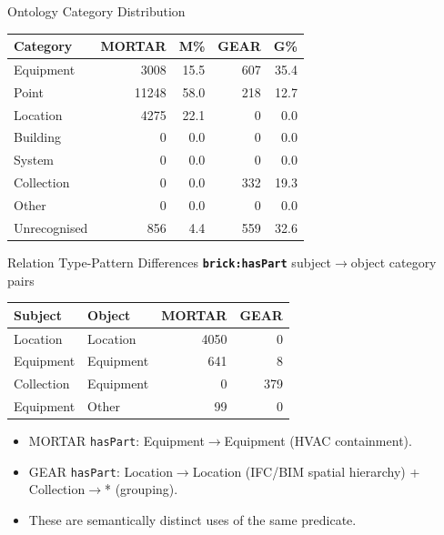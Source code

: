 \documentclass[10pt]{beamer}
\begin{document}
\begin{frame}{Ontology Category Distribution}
  \begin{table}
    \centering
    \small
    \begin{tabular}{lrrrr}
      \toprule
      \textbf{Category} & \textbf{MORTAR} & \textbf{M\%} & \textbf{GEAR} & \textbf{G\%} \\
      \midrule
Equipment & 3008 & 15.5 & 607 & 35.4 \\
Point & 11248 & 58.0 & 218 & 12.7 \\
Location & 4275 & 22.1 & 0 & 0.0 \\
Building & 0 & 0.0 & 0 & 0.0 \\
System & 0 & 0.0 & 0 & 0.0 \\
Collection & 0 & 0.0 & 332 & 19.3 \\
Other & 0 & 0.0 & 0 & 0.0 \\
Unrecognised & 856 & 4.4 & 559 & 32.6 \\
      \bottomrule
    \end{tabular}
  \end{table}
\end{frame}

\begin{frame}{Relation Type-Pattern Differences}
  \textbf{\texttt{brick:hasPart}} subject$\to$object category pairs\par
  \begin{table}
    \small
    \begin{tabular}{llrr}
      \toprule
      Subject & Object & MORTAR & GEAR \\
      \midrule
Location & Location & 4050 & 0 \\
Equipment & Equipment & 641 & 8 \\
Collection & Equipment & 0 & 379 \\
Equipment & Other & 99 & 0 \\
      \bottomrule
    \end{tabular}
  \end{table}
  \begin{itemize}
    \item MORTAR \texttt{hasPart}: Equipment$\to$Equipment (HVAC containment).
    \item GEAR \texttt{hasPart}: Location$\to$Location (IFC/BIM spatial hierarchy) +
          Collection$\to$* (grouping).
    \item These are semantically distinct uses of the same predicate.
  \end{itemize}
\end{frame}
\end{document}
